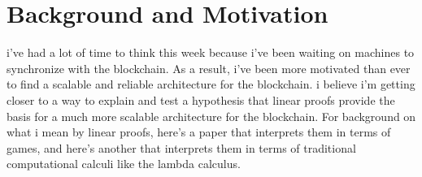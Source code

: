 \documentclass[fleqn]{acm_proc_article-sp}
\title{\papertitle}
\author{
L.G. Meredith\\
  \affaddr{Biosimilarity, LLC}\\
  \email{\fontsize{8}{8}\selectfont lgreg.meredith@biosimilarity.com}
}
\numberwithin{equation}{subsection}
\newcommand{\paperversion}{Draft Version 0.1 - Jan 7, 2015}
\newenvironment{toc}
{
\begin{list}{}{
   \setlength{\leftmargin}{0.4in}
   \setlength{\rightmargin}{0.6in}
   \setlength{\parskip}{0pt}
 } \item }
{\end{list}}
\begin{document}
\lstset{language=}

\setlength{\topmargin}{0in}
\setlength{\textheight}{8.5in}
\setlength{\parskip}{6pt}


\begin{abstract}
\normalsize{ 

  We present an interpretation of classical linear logic in terms of operations on the blockchain.

}

\end{abstract}


\maketitle




\section{Background and Motivation}

i've had a lot of time to think this week because i've been waiting on
machines to synchronize with the blockchain. As a result, i've been
more motivated than ever to find a scalable and reliable architecture
for the blockchain. i believe i'm getting closer to a way to explain
and test a hypothesis that linear proofs provide the basis for a much
more scalable architecture for the blockchain. For background on what
i mean by linear proofs, here's a paper that interprets them in terms
of games, and here's another that interprets them in terms of
traditional computational calculi like the lambda calculus.
\end{document}
